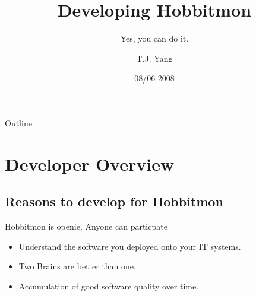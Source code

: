 \documentclass{beamer}
\title[Hobbitmon Development] %
{Developing Hobbitmon}
\subtitle {Yes, you can do it.} %
\author[Tyng-Jing Yang] %
{T.J. Yang }
\institute[Hobbitmon Monitor Community] %
{
  Hobbitmon Monitor Community}
\date[Short Occasion] %
{08/06 2008}
\begin{document}
\begin{frame}
  \titlepage
\end{frame}

\begin{frame}{Outline}
  \tableofcontents
\end{frame}




\section{Developer Overview}

\subsection[Why developing Hobbitmon ]{Reasons to develop for Hobbitmon}

\begin{frame}
{Hobbitmon is open}{ie, Anyone can particpate}

  \begin{itemize}
 \item
    Understand the software you deployed onto your IT systems.
   \item
    Two Brains are better than one. 
  \item
    Accumulation of good software quality over time.
  \end{itemize}
\end{frame}
\end{document}
